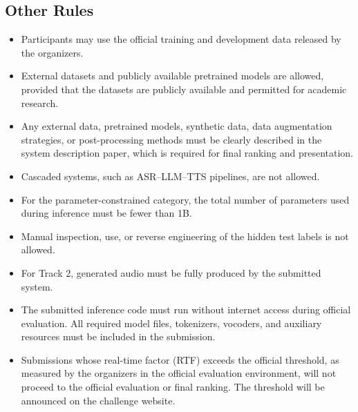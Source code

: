 \documentclass[a4paper]{article}
\begin{document}
\subsection{Other Rules}

\begin{itemize}[leftmargin=*, itemsep=1pt, topsep=2pt, parsep=0pt]
    \item Participants may use the official training and development data released by the organizers.\\
    
    \item External datasets and publicly available pretrained models are allowed, provided that the datasets are publicly available and permitted for academic research.\\
    
    \item Any external data, pretrained models, synthetic data, data augmentation strategies, or post-processing methods must be clearly described in the system description paper, which is required for final ranking and presentation.\\
    
    \item Cascaded systems, such as ASR--LLM--TTS pipelines, are not allowed.\\
    
    \item For the parameter-constrained category, the total number of parameters used during inference must be fewer than 1B.\\
    
    \item Manual inspection, use, or reverse engineering of the hidden test labels is not allowed.\\
    
    \item For Track 2, generated audio must be fully produced by the submitted system.\\
    
    \item The submitted inference code must run without internet access during official evaluation. All required model files, tokenizers, vocoders, and auxiliary resources must be included in the submission.\\
    
    \item Submissions whose real-time factor (RTF) exceeds the official threshold, as measured by the organizers in the official evaluation environment, will not proceed to the official evaluation or final ranking. The threshold will be announced on the challenge website.\\
\end{itemize}
\end{document}
